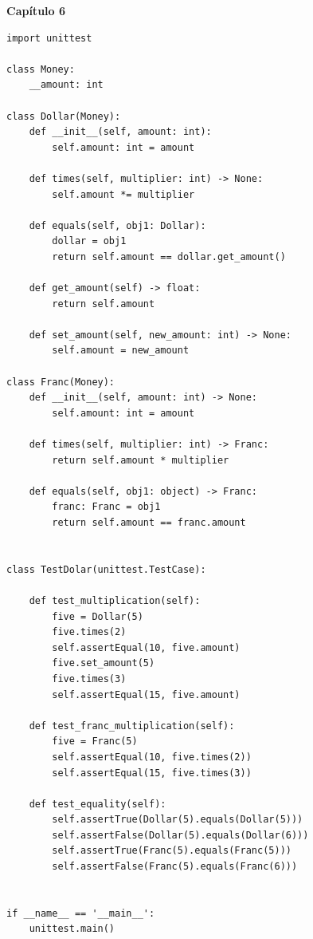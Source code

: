 \documentclass[a4paper,12pt]{article}
\newcommand{\capitulo}[1]{
    \vspace{1em}
    \noindent
    \colorbox{black!15}{
        \parbox{\dimexpr\linewidth-2\fboxsep}{
            \centering \Large \textbf{#1}
        }
    }
    \vspace{1em}
}
\begin{document}
\capitulo{Capítulo 6}
\begin{lstlisting}[style=pythonstyle]
import unittest

class Money:
    __amount: int

class Dollar(Money):
    def __init__(self, amount: int):
        self.amount: int = amount

    def times(self, multiplier: int) -> None:
        self.amount *= multiplier

    def equals(self, obj1: Dollar):
        dollar = obj1
        return self.amount == dollar.get_amount()

    def get_amount(self) -> float:
        return self.amount

    def set_amount(self, new_amount: int) -> None:
        self.amount = new_amount

class Franc(Money):
    def __init__(self, amount: int) -> None:
        self.amount: int = amount

    def times(self, multiplier: int) -> Franc:
        return self.amount * multiplier

    def equals(self, obj1: object) -> Franc:
        franc: Franc = obj1 
        return self.amount == franc.amount


class TestDolar(unittest.TestCase):

    def test_multiplication(self):
        five = Dollar(5)
        five.times(2) 
        self.assertEqual(10, five.amount)
        five.set_amount(5)
        five.times(3) 
        self.assertEqual(15, five.amount)

    def test_franc_multiplication(self):
        five = Franc(5)
        self.assertEqual(10, five.times(2))
        self.assertEqual(15, five.times(3))

    def test_equality(self):
        self.assertTrue(Dollar(5).equals(Dollar(5)))
        self.assertFalse(Dollar(5).equals(Dollar(6)))
        self.assertTrue(Franc(5).equals(Franc(5)))
        self.assertFalse(Franc(5).equals(Franc(6)))


if __name__ == '__main__':
    unittest.main()
\end{lstlisting}
\end{document}
